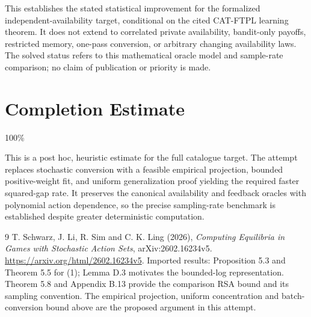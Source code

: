 \documentclass[11pt,a4paper]{article}
\begin{document}
This establishes the stated statistical improvement for the formalized independent-availability target, conditional on the cited CAT-FTPL learning theorem. It does not extend to correlated private availability, bandit-only payoffs, restricted memory, one-pass conversion, or arbitrary changing availability laws. The solved status refers to this mathematical oracle model and sample-rate comparison; no claim of publication or priority is made.

\section{Completion Estimate}
100\%

This is a post hoc, heuristic estimate for the full catalogue target.
The attempt replaces stochastic conversion with a feasible empirical projection, bounded positive-weight fit, and uniform generalization proof yielding the required faster squared-gap rate. It preserves the canonical availability and feedback oracles with polynomial action dependence, so the precise sampling-rate benchmark is established despite greater deterministic computation.

\begin{thebibliography}{9}
 T. Schwarz, J. Li, R. Sim and C. K. Ling (2026), \emph{Computing Equilibria in Games with Stochastic Action Sets}, arXiv:2602.16234v5. \url{https://arxiv.org/html/2602.16234v5}. Imported results: Proposition 5.3 and Theorem 5.5 for (1); Lemma D.3 motivates the bounded-log representation. Theorem 5.8 and Appendix B.13 provide the comparison RSA bound and its sampling convention. The empirical projection, uniform concentration and batch-conversion bound above are the proposed argument in this attempt.
\end{thebibliography}
\end{document}
